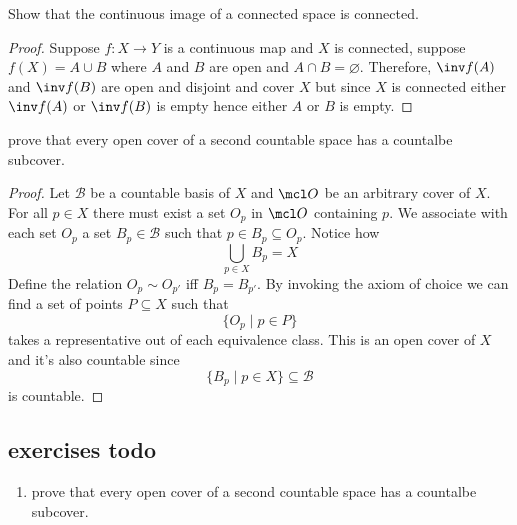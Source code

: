 \documentclass{pset}
\begin{document}
\maketitle

\pagebreak 
\begin{problem}
    Show that the continuous image of a connected space is connected.
    \begin{proof}
        Suppose $f\colon X \longrightarrow Y$ is a continuous map and $X$ is connected, suppose $f(X) = A\cup B$ where $A$ and $B$ are open and $A\cap B=\varnothing$. Therefore, $\inv f (A)$ and $\inv f (B)$ are open and disjoint and cover $X$ but since $X$ is connected either $\inv f (A)$ or $\inv f (B)$ is empty hence either $A$ or $B$ is empty.
    \end{proof}
\end{problem}
\begin{problem}
    prove that every open cover of a second countable space has a countalbe subcover.
    \begin{proof}
        Let $\mathscr B$ be a countable basis of $X$ and $\mcl O$ be an arbitrary cover of $X$. For all $p\in X$ there must exist a set $O_p$ in $\mcl O$ containing $p$. We associate with each set $O_p$ a set $B_p\in \mathscr B$ such that $p\in B_p\subseteq O_p$. Notice how
        \[\bigcup_{p\in X} B_p = X\]
        Define the relation $O_p \sim O_{p'}$ iff $B_p = B_{p'}$. By invoking the axiom of choice we can find a set of points $P\subseteq X$ such that
        \[\{O_p \mid p\in P\}\]
        takes a representative out of each equivalence class. This is an open cover of $X$ and it's also countable since 
        \[\{B_p\mid p\in X\} \subseteq \mathscr B\]
        is countable.
    \end{proof}
\end{problem}
\subsection{exercises todo}
\begin{enumerate}
    \item prove that every open cover of a second countable space has a countalbe subcover.
\end{enumerate}
\end{document}
